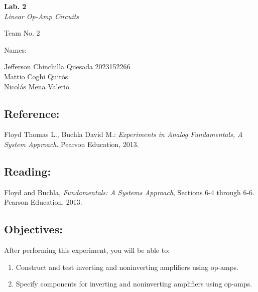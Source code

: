 \documentclass[11pt]{article}
\begin{document}
\begin{center}
    {\LARGE \bfseries Lab. 2}\\[0.3em]
    {\Large \itshape Linear Op-Amp Circuits}
\end{center}

\vspace{1em}

\noindent Team No. 2

\vspace{0.5em}

\noindent Names:


\begin{tabbing}
\hspace{1cm} \= Jefferson Chinchilla Quesada \hspace{0.3cm} \= 2023152266  \\[0.6cm]
\> Mattio Coghi Quirós  \\[0.6cm]
\> Nicolás Mena Valerio 
\end{tabbing}

\vspace{1em}
\vspace{1em}

\subsection*{Reference:}
Floyd Thomas L., Buchla David M.: \textit{Experiments in Analog Fundamentals, A System Approach}. Pearson Education, 2013.

\subsection*{Reading:}
Floyd and Buchla, \textit{Fundamentals: A Systems Approach}, Sections 6-4 through 6-6. Pearson Education, 2013.

\subsection*{Objectives:}
After performing this experiment, you will be able to:
\begin{enumerate}[label=\arabic*.]
    \item Construct and test inverting and noninverting amplifiers using op-amps.
    \item Specify components for inverting and noninverting amplifiers using op-amps.
\end{enumerate}
\end{document}
